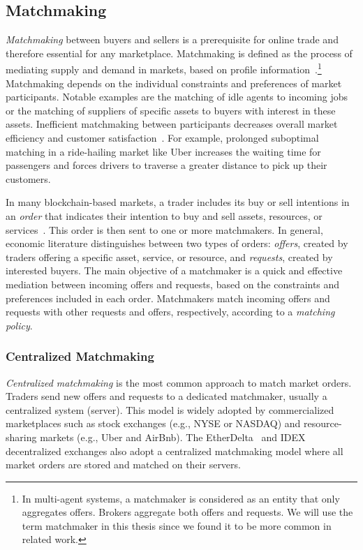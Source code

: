 \subsection{Matchmaking}
\label{sec:matchmaking}
\emph{Matchmaking} between buyers and sellers is a prerequisite for online trade and therefore essential for any marketplace.
Matchmaking is defined as the process of mediating supply and demand in markets, based on profile information~\cite{veit2003matchmaking}.\footnote{In multi-agent systems, a matchmaker is considered as an entity that only aggregates offers. Brokers aggregate both offers and requests. We will use the term matchmaker in this thesis since we found it to be more common in related work.}
Matchmaking depends on the individual constraints and preferences of market participants.
Notable examples are the matching of idle agents to incoming jobs or the matching of suppliers of specific assets to buyers with interest in these assets.
Inefficient matchmaking between participants decreases overall market efficiency and customer satisfaction~\cite{Wu2015TheM}.
For example, prolonged suboptimal matching in a ride-hailing market like Uber increases the waiting time for passengers and forces drivers to traverse a greater distance to pick up their customers.

In many blockchain-based markets, a trader includes its buy or sell intentions in an \emph{order} that indicates their intention to buy and sell assets, resources, or services~\cite{veit2003matchmaking}.
This order is then sent to one or more matchmakers.
In general, economic literature distinguishes between two types of orders: \emph{offers}, created by traders offering a specific asset, service, or resource, and \emph{requests}, created by interested buyers.
The main objective of a matchmaker is a quick and effective mediation between incoming offers and requests, based on the constraints and preferences included in each order.
Matchmakers match incoming offers and requests with other requests and offers, respectively, according to a \emph{matching policy}.

\subsubsection{Centralized Matchmaking}
\emph{Centralized matchmaking} is the most common approach to match market orders.
Traders send new offers and requests to a dedicated matchmaker, usually a centralized system (server).
This model is widely adopted by commercialized marketplaces such as stock exchanges (e.g., NYSE or NASDAQ) and resource-sharing markets (e.g., Uber and AirBnb).
The EtherDelta~\cite{etherdelta} and IDEX~\cite{idex} decentralized exchanges also adopt a centralized matchmaking model where all market orders are stored and matched on their servers.

